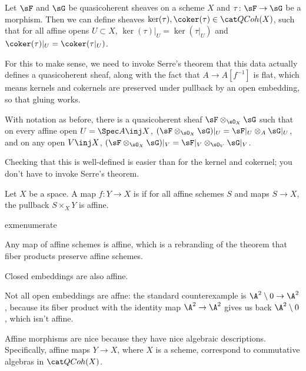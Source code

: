 \begin{defn}
Let $\sF$ and $\sG$ be quasicoherent sheaves on a scheme $X$ and $\tau\colon\sF\to\sG$ be a morphism. Then we can
define sheaves $\ker(\tau),\coker(\tau)\in\QCoh(X)$, such that for all affine opens $U\subset X$, $\ker(\tau)|_U
= \ker(\tau|_U)$ and $\coker(\tau)|_U = \coker(\tau|_U)$.
\end{defn}
For this to make sense, we need to invoke Serre's theorem that this data actually defines a quasicoherent sheaf,
along with the fact that $A\to A[f^{-1}]$ is flat, which means kernels and cokernels are preserved under
pullback by an open embedding, so that gluing works.
\begin{defn}
With notation as before, there is a quasicoherent sheaf $\sF\otimes_{\sO_X}\sG$ such that on every affine open $U =
\Spec A\inj X$, $(\sF\otimes_{\sO_X}\sG)|_U = \sF|_U\otimes_A \sG|_U$, and on any open $V\inj X$,
$(\sF\otimes_{\sO_X}\sG)|_V = \sF|_V\otimes_{\sO_V}\sG|_V$.
\end{defn}
Checking that this is well-defined is easier than for the kernel and cokernel; you don't have to invoke Serre's
theorem.
\begin{defn}
Let $X$ be a space. A map $f\colon Y\to X$ is  if for all affine schemes $S$ and maps $S\to X$, the
pullback $S\times_X Y$ is affine.
\end{defn}
\begin{comp}{exm}{enumerate}
	\item Any map of affine schemes is affine, which is a rebranding of the theorem that fiber products preserve
	affine schemes.
	\item Closed embeddings are also affine.
	\item Not all open embeddings are affne: the standard counterexample is $\A^2\setminus 0\to\A^2$, because its
	fiber product with the identity map $\A^2\to\A^2$ gives us back $\A^2\setminus 0$, which isn't affine.
	\qedhere
\end{comp}
Affine morphisms are nice because they have nice algebraic descriptions. Specifically, affine maps $Y\to X$, where
$X$ is a scheme, correspond to commutative algebras in $\QCoh(X)$.
